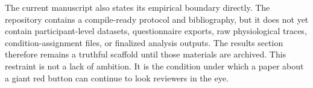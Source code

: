 The current manuscript also states its empirical boundary directly. The repository contains a compile-ready protocol and bibliography, but it does not yet contain participant-level datasets, questionnaire exports, raw physiological traces, condition-assignment files, or finalized analysis outputs. The results section therefore remains a truthful scaffold until those materials are archived. This restraint is not a lack of ambition. It is the condition under which a paper about a giant red button can continue to look reviewers in the eye.
